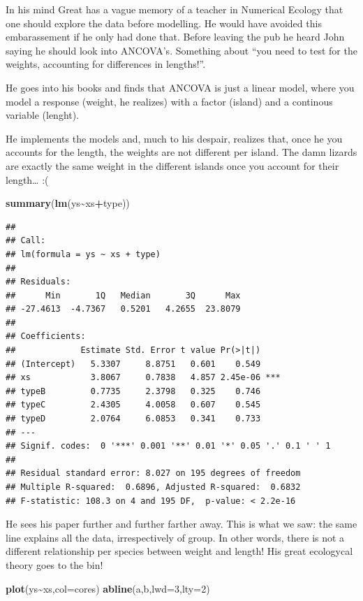 \documentclass[
]{book}
\newenvironment{Shaded}{\begin{snugshade}}{\end{snugshade}}
\newcommand{\AttributeTok}[1]{\textcolor[rgb]{0.13,0.29,0.53}{#1}}
\newcommand{\DecValTok}[1]{\textcolor[rgb]{0.00,0.00,0.81}{#1}}
\newcommand{\FunctionTok}[1]{\textcolor[rgb]{0.13,0.29,0.53}{\textbf{#1}}}
\newcommand{\NormalTok}[1]{#1}
\newcommand{\SpecialCharTok}[1]{\textcolor[rgb]{0.81,0.36,0.00}{\textbf{#1}}}
\begin{document}
In his mind Great has a vague memory of a teacher in Numerical Ecology that one should explore the data before modelling. He would have avoided this embarassement if he only had done that. Before leaving the pub he heard John saying he should look into ANCOVA's. Something about ``you need to test for the weights, accounting for differences in lengths!''.

He goes into his books and finds that ANCOVA is just a linear model, where you model a response (weight, he realizes) with a factor (island) and a continous variable (lenght).

He implements the models and, much to his despair, realizes that, once he you accounts for the length, the weights are not different per island. The damn lizards are exactly the same weight in the different islands once you account for their length\ldots{} :(

\begin{Shaded}
\begin{Highlighting}[]
\FunctionTok{summary}\NormalTok{(}\FunctionTok{lm}\NormalTok{(ys}\SpecialCharTok{\textasciitilde{}}\NormalTok{xs}\SpecialCharTok{+}\NormalTok{type))}
\end{Highlighting}
\end{Shaded}

\begin{verbatim}
## 
## Call:
## lm(formula = ys ~ xs + type)
## 
## Residuals:
##      Min       1Q   Median       3Q      Max 
## -27.4613  -4.7367   0.5201   4.2655  23.8079 
## 
## Coefficients:
##             Estimate Std. Error t value Pr(>|t|)    
## (Intercept)   5.3307     8.8751   0.601    0.549    
## xs            3.8067     0.7838   4.857 2.45e-06 ***
## typeB         0.7735     2.3798   0.325    0.746    
## typeC         2.4305     4.0058   0.607    0.545    
## typeD         2.0764     6.0853   0.341    0.733    
## ---
## Signif. codes:  0 '***' 0.001 '**' 0.01 '*' 0.05 '.' 0.1 ' ' 1
## 
## Residual standard error: 8.027 on 195 degrees of freedom
## Multiple R-squared:  0.6896, Adjusted R-squared:  0.6832 
## F-statistic: 108.3 on 4 and 195 DF,  p-value: < 2.2e-16
\end{verbatim}

He sees his paper further and further farther away. This is what we saw: the same line explains all the data, irrespectively of group. In other words, there is not a different relationship per species between weight and length! His great ecologycal theory goes to the bin!

\begin{Shaded}
\begin{Highlighting}[]
\FunctionTok{plot}\NormalTok{(ys}\SpecialCharTok{\textasciitilde{}}\NormalTok{xs,}\AttributeTok{col=}\NormalTok{cores)}
\FunctionTok{abline}\NormalTok{(a,b,}\AttributeTok{lwd=}\DecValTok{3}\NormalTok{,}\AttributeTok{lty=}\DecValTok{2}\NormalTok{)}
\end{Highlighting}
\end{Shaded}
\end{document}
